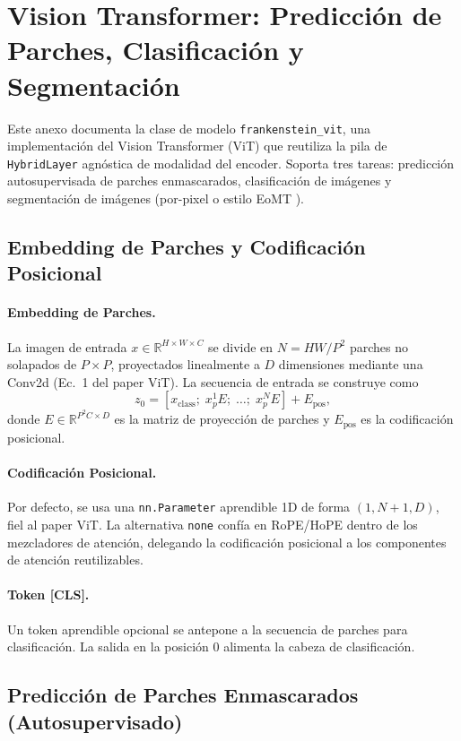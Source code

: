 \section{Vision Transformer: Predicción de Parches, Clasificación y Segmentación}
\label{sec:annex-vision}

Este anexo documenta la clase de modelo \texttt{frankenstein\_vit}, una implementación del Vision Transformer (ViT) \citep{dosovitskiy2021vit} que reutiliza la pila de \texttt{HybridLayer} agnóstica de modalidad del encoder. Soporta tres tareas: predicción autosupervisada de parches enmascarados, clasificación de imágenes y segmentación de imágenes (por-pixel o estilo EoMT \citep{kerssies2025eomt}).

\subsection{Embedding de Parches y Codificación Posicional}

\paragraph{Embedding de Parches.}
La imagen de entrada $x \in \mathbb{R}^{H \times W \times C}$ se divide en $N = HW/P^2$ parches no solapados de $P \times P$, proyectados linealmente a $D$ dimensiones mediante una Conv2d (Ec.~1 del paper ViT). La secuencia de entrada se construye como
\[
z_0 = [x_\text{class};\; x_p^1 E;\; \dots;\; x_p^N E] + E_\text{pos},
\]
donde $E \in \mathbb{R}^{P^2 C \times D}$ es la matriz de proyección de parches y $E_\text{pos}$ es la codificación posicional.

\paragraph{Codificación Posicional.}
Por defecto, se usa una \texttt{nn.Parameter} aprendible 1D de forma $(1, N+1, D)$, fiel al paper ViT. La alternativa \texttt{none} confía en RoPE/HoPE dentro de los mezcladores de atención, delegando la codificación posicional a los componentes de atención reutilizables.

\paragraph{Token [CLS].}
Un token aprendible opcional se antepone a la secuencia de parches para clasificación. La salida en la posición 0 alimenta la cabeza de clasificación.

\subsection{Predicción de Parches Enmascarados (Autosupervisado)}

